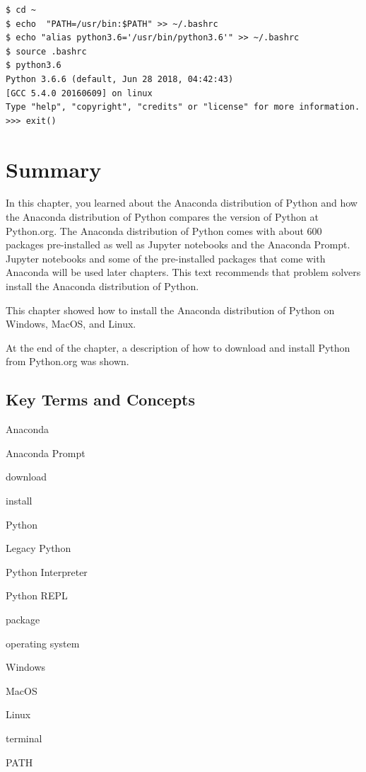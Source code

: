 \documentclass{book}
\newenvironment{key_terms}{\begin{multicols}{3}}{\end{multicols}} %
\begin{document}
\begin{lstlisting}
$ cd ~
$ echo  "PATH=/usr/bin:$PATH" >> ~/.bashrc 
$ echo "alias python3.6='/usr/bin/python3.6'" >> ~/.bashrc
$ source .bashrc
$ python3.6
Python 3.6.6 (default, Jun 28 2018, 04:42:43)
[GCC 5.4.0 20160609] on linux
Type "help", "copyright", "credits" or "license" for more information.
>>> exit()
\end{lstlisting}
    




    
        \newpage
        \section{Summary}\label{summary}

    




    
        In this chapter, you learned about the Anaconda distribution of Python
and how the Anaconda distribution of Python compares the version of
Python at Python.org. The Anaconda distribution of Python comes with
about 600 packages pre-installed as well as Jupyter notebooks and the
Anaconda Prompt. Jupyter notebooks and some of the pre-installed
packages that come with Anaconda will be used later chapters. This text
recommends that problem solvers install the Anaconda distribution of
Python.

This chapter showed how to install the Anaconda distribution of Python
on Windows, MacOS, and Linux.

At the end of the chapter, a description of how to download and install
Python from Python.org was shown.
    




    
        \subsection{Key Terms and Concepts}\label{key-terms-and-concepts}
    




    
        \begin{key_terms}
        Anaconda

Anaconda Prompt

download

install

Python

Legacy Python

Python Interpreter

Python REPL

package

operating system

Windows

MacOS

Linux

terminal

PATH
        \end{key_terms}
\end{document}

